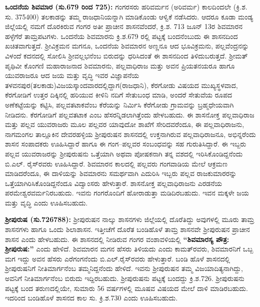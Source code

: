 \textbf{ ಒಂದನೆಯ ಶಿವಮಾರ (ಸು.679 ರಿಂದ 725): }ಗಂಗರಸರು ಹರಿವರ್ಮನ (ಅರಿವರ್ಮ) ಕಾಲದಿಂದಲೇ (ಕ್ರಿ.ಶ. ಸು. 375400) ತಲಕಾಡನ್ನು ತಮ್ಮ ರಾಜಧಾನಿಯನ್ನಾಗಿ ಮಾಡಿಕೊಂಡು ಆಳ್ವಿಕೆ ನಡೆಸಿದರು. ಆದರೂ ಕೂಡಾ ಮಂಡ್ಯ ಜಿಲ್ಲೆಯಲ್ಲಿ ನಮಗೆ ದೊರಕಿರುವ ಗಂಗರ ಅತೀ ಪ್ರಾಚೀನ ಶಾಸನವೆಂದರೆ, ಕ್ರಿ.ಶ. 713 ಜೂನ್​ 13ರ ಶಿವಮಾರನ ಹಳ್ಳೆಗೆರೆ ತಾಮ್ರಪಟಗಳು. ಒಂದನೆಯ ಶಿವಮಾರನು ಕ್ರಿ.ಶ.679 ರಲ್ಲಿ ಪಟ್ಟಕ್ಕೆ ಬಂದನೆಂಬುದು ಈ ಶಾಸನದಿಂದ ಖಚಿತವಾಗುತ್ತದೆ. ಶ‍್ರೀವಿಕ್ರಮನ ಮಗನೂ, ಒಂದನೆಯ ಶಿವಮಾರನ ಅಣ್ಣನೂ ಆದ ಭೂವಿಕ್ರಮನು, ಪಲ್ಲವೆಂದ್ರನನ್ನು ವಿಳಂದೆ ಕದನದಲ್ಲಿ ಸೋಲಿಸಿ ಶ‍್ರೀವಲ್ಲಭನೆಂಬ ಬಿರುದನ್ನು ಧರಿಸಿದಂತೆ ಈ ಶಾಸನದಿಂದ ತಿಳಿದುಬರುತ್ತದೆ. ಶ‍್ರೀಮತ್​ ಪೃಥಿವೀ ಕೊಂಗಣಿ ಮಹಾರಾಜನಾದ ಶಿವಮಾರನು, ಪಲ್ಲವಾಧಿರಾಜ ಮತ್ತು ಅವನ ಪ್ರಿಯತನಯರೂ ಹಾಗೂ ಯುವರಾಜರೂ ಆದ ಜಯ ಮತ್ತು ವೃದ್ಧಿ ಇವರ ವಿಜ್ಞಾಪನೆಯ ತಳವನಪುರ(ತಲಕಾಡು)ವಿಜಯಸ್ಕಾಂದವಾರದಲ್ಲಿದ್ದಾಗ(ರಾಜಧಾನಿ), ಕೆರಗೋಡು ವಿಷಯದ ಮುಖ್ಯಸ್ಥಳವಾದ, ಕೆರಗೋಡಿಗೆ ಉತ್ತರ ದಿಕ್ಕಿನಲ್ಲಿ ಹರಿಯುವ ಕೀಳಿನಿ ನದಿಗೆ ಸೇತುಬಂಧ ಮಾಡಿ, ಅಂದರೆ ಸೇತುವೆಯ ರೂಪದ ಅಣೆಕಟ್ಟೆಯನ್ನು ಕಟ್ಟಿಸಿ, ಪಲ್ಲವತಟಾಕವೆಂಬ ಕೆರೆಯನ್ನು ನಿರ್ಮಿಸಿ ಕೆರೆಗೋಡು ಗ್ರಾಮವನ್ನು ಬ್ರಹ್ಮಧೇಯವಾಗಿ ನೀಡಿದನು. ಕೆರಗೋಡಿಗೆ ಪಲ್ಲವತಟಾಕ ಎಂಬ ಹೆಸರನ್ನಿಡಲಾಗಿತ್ತೆಂದು ಹೇಳಬಹುದು. ಈ ಶಾಸನೋಕ್ತ ಪಲ್ಲವಾಧಿರಾಜ ಮತ್ತು ಪಲ್ಲವ ಯುವರಾಜರು ಮೂಲ ಪಲ್ಲವರ ಯಾವುದೋ ಶಾಖೆಗೆ ಸೇರಿದವರೆಂದೂ, ಈ ಪಲ್ಲವಾಧಿರಾಜನು, ನಾಗಮಂಗಲ ತಾಲ್ಲೂಕಿನ ದೇವರಹಳ್ಳಿಯ ಶ‍್ರೀಪುರುಷನ ಶಾಸನದಲ್ಲಿ ಉಕ್ತನಾಗಿರುವ ಪಲ್ಲವಾಧಿರಾಜನೂ, ಅಭಿನ್ನರೆಂದು ಶಾಸನ ಸಂಪಾದಕರು ಊಹಿಸಿದ್ದಾರೆ ಹಾಗೂ ಈ ಗಂಗ–ಪಲ್ಲವರ ಸಂಬಂಧವನ್ನು ಸಹ ಗುರುತಿಸಿದ್ದಾರೆ. ಈ ಇಬ್ಬರು ಪಲ್ಲವ ಯುವರಾಜರನ್ನು ಶ‍್ರೀಪುರುಷನು ಒತ್ತೆಯಾಗಿ ಅಥವಾ ಪೋಷಕನಾಗಿ ತನ್ನ ವಶದಲ್ಲಿ ಇರಿಸಿಕೊಂಡಿದ್ದನೆಂದು ಬಿ.ಎಲ್​. ರೈಸ್​ರವರು ಊಹಿಸಿದ್ದಾರೆ. ಶಿವಮಾರನ ಕಾಲದಲ್ಲಿ ಪಲ್ಲವರು ಗಂಗವಾಡಿಯ ಮೇಲೆ ಆಕ್ರಮಣ ಮಾಡಿದರೆಂದೂ, ಈ ದಾಳಿಯನ್ನು ಶಿವಮಾರನು ಸಮರ್ಥವಾಗಿ ಎದುರಿಸಿ ಇಬ್ಬರು ಪಲ್ಲವ ರಾಜಕುಮಾರರನ್ನು ಒತ್ತೆಯಾಗಿರಿಸಿಕೊಂಡಿದ್ದನೆಂದೂ ವಿದ್ವಾಂಸರು ಹೇಳುತ್ತಾರೆ. ಶಾಸನೋಕ್ತ ಪಲ್ಲವಾಧಿರಾಜನು ಎರಡನೆಯ ಪರಮೇಶ್ವರವರ್ಮನಿರಬಹುದು. ಇವನು ಗಂಗರೊಂದಿಗೆ ಹೋರಾಡುತ್ತಾ ಮಡಿದಿರಬಹುದು. ಇವನ ಮಕ್ಕಳೇ ಜಯ ಮತ್ತು ವೃದ್ಧಿ ಎಂದು ಊಹಿಸಬಹುದು. 

\textbf{ ಶ‍್ರೀಪುರುಷ (ಸು.726788):} ಶ‍್ರೀಪುರುಷನ ನಾಲ್ಕು ಶಾಸನಗಳು ಜಿಲ್ಲೆಯಲ್ಲಿ ದೊರೆತಿದ್ದು ಅವುಗಳಲ್ಲಿ ಮೂರು ತಾಮ್ರ ಶಾಸನಗಳು ಹಾಗೂ ಒಂದು ಶಿಲಾಶಾಸನ. ಇತ್ತೀಚೆಗೆ ದೊರೆತ ಬಂಡಿಹೊಳೆ ತಾಮ್ರ ಶಾಸನವೇ ಶ‍್ರೀಪುರುಷನ ಪ್ರಾಚೀನ ಶಾಸನ ಎಂದು ಹೇಳಬಹುದು. ಈ ಶಾಸನದಲ್ಲಿ ನೀಡಿರುವ ಗಂಗರ ವಂಶಾವಳಿಯಲ್ಲಿ \textbf{“ಶಿವಮಾರಸ್ಯ ಪೌತ್ರ: ಶ‍್ರೀಪುರುಷ:”} ಎಂದು ಹೇಳಿದೆ. ಶಿವಮಾರನ ಮಗನ ಹೆಸರು ತಿಳಿಯದು ಎಂದು ಕಾಮತ್​ರವರು, ಶಿವಮಾರನಿಗೆ ಒಬ್ಬ ಮಗ ಇದ್ದು ಅವನ ಹೆಸರು ಎರೆಗಂಗನೆಂದು ಬಿ.ಎಲ್​.ರೈಸ್​ರವರು ಹೇಳುತ್ತಾರೆ. ಬಂಡಿ ಹೊಳೆ ಶಾಸನದಲ್ಲಿ ಶ‍್ರೀಪುರುಷನಿಗೆ ನೀತಿಮಾರ್ಗನೆಂಬ ತಮ್ಮನಿದ್ದನೆಂದು ಹೇಳಿದೆ. ಇವನು ಶ‍್ರೀಪುರುಷನ ತಮ್ಮ ವಿಜಯಾದಿತ್ಯನಾಗಿದ್ದು, ಅವನಿಗೆ ನೀತಿಮಾರ್ಗನೆಂಬ ಬಿರುದು ಇದ್ದಿರಬಹುದು. ಶ‍್ರೀಪುರುಷನು ಪಟ್ಟಕ್ಕೆ ಬಂದದ್ದು ಕ್ರಿ.ಶ.726. ಶ‍್ರೀಪುರುಷನು ಪಟ್ಟಕ್ಕೆ ಬಂದ ತರುಣದಲ್ಲಿಯೇ, ಸುಮಾರು 56 ವರ್ಷಗಳಲ್ಲಿ ಮೂಷವ ವಿಷಯದ ಮೇಲೆ ದಾಳಿ ಮಾಡಿರಬಹುದು. ಇದರಿಂದ ಬಂಡಿಹೊಳೆ ಶಾಸನದ ಕಾಲ ಸು. ಕ್ರಿ.ಶ.730 ಎಂದು ಊಹಿಸಬಹುದು. 


